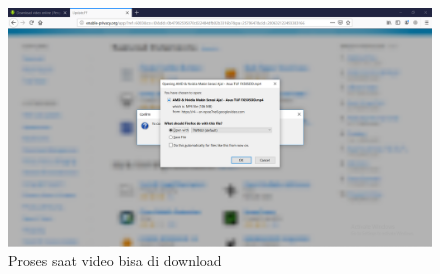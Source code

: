 \begin{figure}[!htbp]
    \centering
    \includegraphics[scale=0.4]{figure/Antarmuka/9.png}
    \caption{ Proses saat video bisa di download}
    \label{gambar 1}
\end{figure}